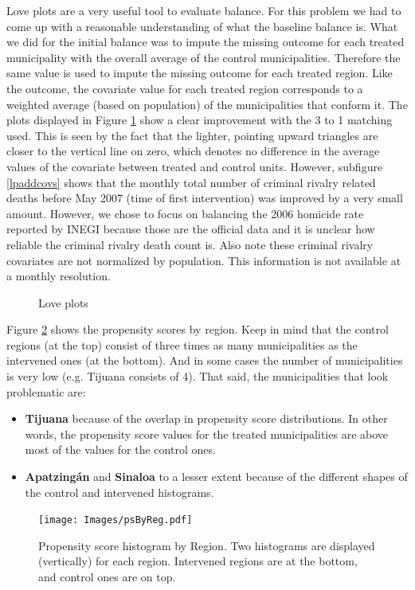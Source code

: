 \documentclass{article}[11 pt]
\begin{document}
Love plots are a very useful tool to evaluate balance. For this problem we had to come up with a reasonable understanding of what the baseline balance is. What we did for the initial balance was to impute the missing outcome for each treated municipality with the overall average of the control municipalities. Therefore the same value is used to impute the missing outcome for each treated region. Like the outcome, the covariate value for each treated region corresponds to a weighted average (based on population) of the municipalities that conform it. The plots displayed in Figure \ref{lpme} show a clear improvement with the 3 to 1 matching used. This is seen by the fact that the lighter, pointing upward triangles are closer to the vertical line on zero, which denotes no difference in the average values of the covariate between treated and control units. However, subfigure \ref{lpaddcovs} shows that the monthly total number of criminal rivalry related deaths before May 2007 (time of first intervention) was improved by a very small amount. However, we chose to focus on balancing the 2006 homicide rate reported by INEGI because those are the official data and it is unclear how reliable the criminal rivalry death count is. Also note these criminal rivalry covariates are not normalized by population. This information is not available at a monthly resolution.

\begin{figure}[htdp]
	\centering
		\caption{Love plots}
		\label{lpme}
\end{figure}

Figure \ref{regionPS} shows the propensity scores by region. Keep in mind that the control regions (at the top) consist of three times as many municipalities as the intervened ones (at the bottom). And in some cases the number of municipalities is very low (e.g. Tijuana consists of 4). That said, the municipalities that look problematic are:
\begin{itemize}
	\item \textbf{Tijuana} because of the overlap in propensity score distributions. In other words, the propensity score values for the treated municipalities are above most of the values for the control ones.
	\item \textbf{Apatzing\'{a}n} and \textbf{Sinaloa} to a lesser extent because of the different shapes of the control and intervened histograms. 	
\end{itemize}	
\begin{figure}[htdp]
	\centering		
	        \texttt{[image: Images/psByReg.pdf]}
	\caption{Propensity score histogram by Region. Two histograms are displayed (vertically) for each region. Intervened regions are at the bottom, and control ones are on top.}
	\label{regionPS}
\end{figure}	
			
\end{document}
